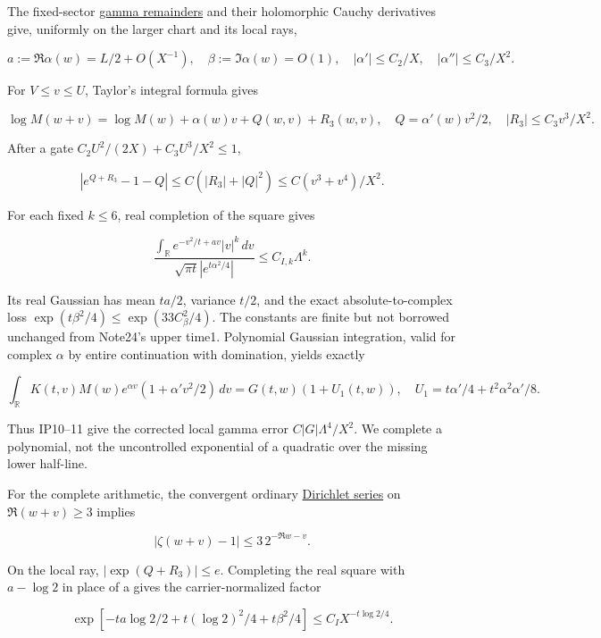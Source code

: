 The fixed-sector \href{https://dlmf.nist.gov/5.11#ii}{gamma remainders} and their holomorphic Cauchy derivatives give, uniformly on the larger chart and its local rays,

\[
a:=\Re\alpha(w)=L/2+O(X^{-1}),\quad
\beta:=\Im\alpha(w)=O(1),\quad
|\alpha'|\le C_2/X,\quad |\alpha''|\le C_3/X^2.
\tag{IP8}\label{eq:ansatz-ip8}
\]

For \(V\le v\le U\), Taylor's integral formula gives

\[
\log M(w+v)=\log M(w)+\alpha(w)v+Q(w,v)+R_3(w,v),
\quad Q=\alpha'(w)v^2/2,\quad |R_3|\le C_3v^3/X^2.
\tag{IP9}\label{eq:ansatz-ip9}
\]

After a gate \(C_2 U^{2}/(2X)+C_3 U^{3}/X^{2}\le 1\),

\[
|e^{Q+R_3}-1-Q|\le C(|R_3|+|Q|^2)
 \le C(v^3+v^4)/X^2.
\tag{IP10}\label{eq:ansatz-ip10}
\]

For each fixed \(k\le 6\), real completion of the square gives

\[
\frac{\int_{\mathbb R}e^{-v^2/t+av}|v|^k\,dv}
 {\sqrt{\pi t}|e^{t\alpha^2/4}|}
 \le C_{I,k}\Lambda^k.
\tag{IP11}\label{eq:ansatz-ip11}
\]

Its real Gaussian has mean \(ta/2\), variance \(t/2\), and the exact absolute-to-complex loss \(\exp(t \beta^{2}/4)\le \exp(33 C_{\beta}^{2}/4)\). The constants are finite but not borrowed unchanged from Note24's upper time1. Polynomial Gaussian integration, valid for complex \(\alpha\) by entire continuation with domination, yields exactly

\[
\int_{\mathbb R}K(t,v)M(w)e^{\alpha v}(1+\alpha'v^2/2)\,dv
 =G(t,w)(1+U_1(t,w)),
\quad U_1=t\alpha'/4+t^2\alpha^2\alpha'/8.
\tag{IP12}\label{eq:ansatz-ip12}
\]

Thus IP10--11 give the corrected local gamma error \(C |G| \Lambda^{4}/X^{2}\). We complete a polynomial, not the uncontrolled exponential of a quadratic over the missing lower half-line.

For the complete arithmetic, the convergent ordinary \href{https://dlmf.nist.gov/25.2.E1}{Dirichlet series} on \(\Re(w+v)\ge 3\) implies

\[
|\zeta(w+v)-1|\le3\,2^{-\Re w-v}.
\tag{IP13}\label{eq:ansatz-ip13}
\]

On the local ray, \(|\exp(Q+R_{3})|\le e\). Completing the real square with \(a-\log2\) in place of a gives the carrier-normalized factor

\[
\exp[-ta\log2/2+t(\log2)^2/4+t\beta^2/4]
 \le C_I X^{-t\log2/4}.
\tag{IP14}\label{eq:ansatz-ip14}
\]

